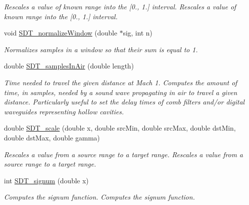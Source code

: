 \begin{DoxyCompactItemize}
\begin{DoxyCompactList}\small\item\em Rescales a value of known range into the \mbox{[}0., 1.\mbox{]} interval. Rescales a value of known range into the \mbox{[}0., 1.\mbox{]} interval. \end{DoxyCompactList}\item 
void \hyperlink{group__common_gaceddebee5e10ac7eeab53e4a75033ea4}{S\+D\+T\+\_\+normalize\+Window} (double $\ast$sig, int n)
\begin{DoxyCompactList}\small\item\em Normalizes samples in a window so that their sum is equal to 1. \end{DoxyCompactList}\item 
double \hyperlink{group__common_ga8d76fd517483f6044bef411ae830aea2}{S\+D\+T\+\_\+samples\+In\+Air} (double length)
\begin{DoxyCompactList}\small\item\em Time needed to travel the given distance at Mach 1. Computes the amount of time, in samples, needed by a sound wave propagating in air to travel a given distance. Particularly useful to set the delay times of comb filters and/or digital waveguides representing hollow cavities. \end{DoxyCompactList}\item 
double \hyperlink{group__common_gaefd9c7447cc1aef51100da1e409755a0}{S\+D\+T\+\_\+scale} (double x, double src\+Min, double src\+Max, double dst\+Min, double dst\+Max, double gamma)
\begin{DoxyCompactList}\small\item\em Rescales a value from a source range to a target range. Rescales a value from a source range to a target range. \end{DoxyCompactList}\item 
int \hyperlink{group__common_gaa68a3bc9231e89b2d15a78fb6675c825}{S\+D\+T\+\_\+signum} (double x)
\begin{DoxyCompactList}\small\item\em Computes the signum function. Computes the signum function. \end{DoxyCompactList}\end{DoxyCompactItemize}
